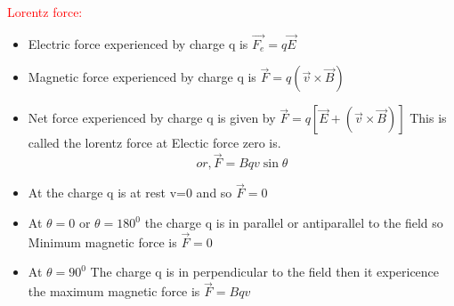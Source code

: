 \documentclass{beamer}
\begin{document}
\begin{frame}
\textcolor{red}{Lorentz force:}\\
\begin{itemize}
\item Electric force experienced by charge q is $\vec{F_e}=q\vec{E}$
\item Magnetic force experienced by charge q is  $\vec{F}=q(\vec{v}\times \vec{B})$\\
\item Net force experienced by charge q is given by $\vec{F}=q[\vec{E}+(\vec{v}\times\vec{B})]$ This is called the lorentz force at Electic force zero is.
\begin{equation}
or, \vec{F}=Bqv\sin\theta
\end{equation}
\item At the charge q is at rest v=0 and so $\vec{F}=0$
\item  At $\theta=0$ or $\theta=180^0$  the charge q is in parallel or antiparallel to the field so Minimum magnetic force is $\vec{F}=0$ 
\item At $\theta=90^0$ The charge q is in perpendicular to the field then it expericence the maximum magnetic force is $\vec{F}=Bqv$
\end{itemize}
\end{frame}
\end{document}
